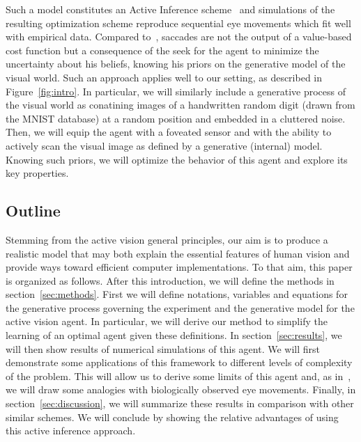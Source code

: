 Such a model constitutes an Active Inference scheme~\citep{Mirza18} and simulations of the resulting optimization scheme reproduce sequential eye movements which fit well with empirical data. Compared to~\citet{Najemnik05}, saccades are not the output of a value-based cost function but a consequence of the seek for the agent to minimize the uncertainty about his beliefs, knowing his priors on the generative model of the visual world. Such an approach applies well to our setting, as described in Figure~\ref{fig:intro}. In particular, we will similarly include a generative process of the visual world as conatining images of a handwritten random digit (drawn from the MNIST database) at a random position and embedded in a cluttered noise. Then, we will equip the agent with a foveated sensor and with the ability to actively scan the visual image as defined by a generative (internal) model. Knowing such priors, we will optimize the behavior of this agent and explore its key properties.

\subsection{Outline}
Stemming from the active vision general principles, our aim is to produce a realistic model that may both explain the essential features of human vision and provide ways toward efficient computer implementations. To that aim, this paper is organized as follows. After this introduction, we will define the methods in section~\ref{sec:methods}. First we will define notations, variables and equations for the generative process governing the experiment and the generative model for the active vision agent. In particular, we will derive our method to simplify the learning of an optimal agent given these definitions. In section~\ref{sec:results}, we will then show results of numerical simulations of this agent. We will first demonstrate some applications of this framework to different levels of complexity of the problem. This will allow us to derive some limits of this agent and, as in~\citep{Najemnik05}, we will draw some analogies with biologically observed eye movements. Finally, in section~\ref{sec:discussion}, we will summarize these results in comparison with other similar schemes. We will conclude by showing the relative advantages of using this active inference approach.
